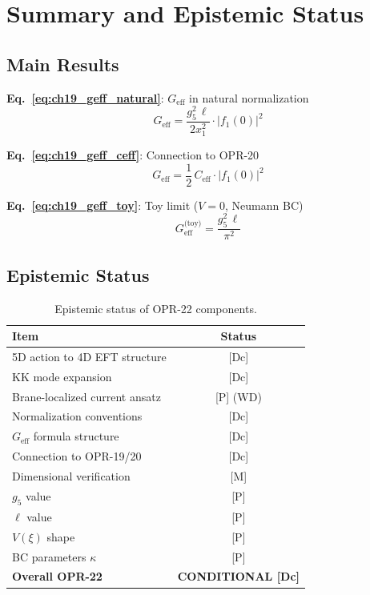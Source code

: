 \section{Summary and Epistemic Status}
\label{sec:ch19_summary}

\subsection{Main Results}

\textbf{Eq.~\eqref{eq:ch19_geff_natural}}: $G_{\text{eff}}$ in natural normalization
\begin{equation}
    G_{\text{eff}} = \frac{g_5^2 \, \ell}{2 x_1^2} \cdot |f_1(0)|^2
\end{equation}

\textbf{Eq.~\eqref{eq:ch19_geff_ceff}}: Connection to OPR-20
\begin{equation}
    G_{\text{eff}} = \frac{1}{2} \, C_{\text{eff}} \cdot |f_1(0)|^2
\end{equation}

\textbf{Eq.~\eqref{eq:ch19_geff_toy}}: Toy limit ($V=0$, Neumann BC)
\begin{equation}
    G_{\text{eff}}^{\text{(toy)}} = \frac{g_5^2 \, \ell}{\pi^2}
\end{equation}

\subsection{Epistemic Status}

\begin{table}[h]
\centering
\begin{tabular}{|l|c|}
\hline
\textbf{Item} & \textbf{Status} \\
\hline
5D action to 4D EFT structure & [Dc] \\
KK mode expansion & [Dc] \\
Brane-localized current ansatz & [P] (WD) \\
Normalization conventions & [Dc] \\
$G_{\text{eff}}$ formula structure & [Dc] \\
Connection to OPR-19/20 & [Dc] \\
Dimensional verification & [M] \\
\hline
$g_5$ value & [P] \\
$\ell$ value & [P] \\
$V(\xi)$ shape & [P] \\
BC parameters $\kappa$ & [P] \\
\hline
\textbf{Overall OPR-22} & \textbf{CONDITIONAL [Dc]} \\
\hline
\end{tabular}
\caption{Epistemic status of OPR-22 components.}
\label{tab:ch19_epistemic}
\end{table}

